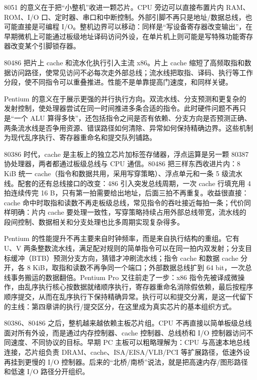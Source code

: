 8051 的意义在于把“小整机”收进一颗芯片。CPU 旁边可以直接布置片内 RAM、ROM、I/O 口、定时器、串口和中断控制。外部引脚不再只是地址/数据总线，也可能直接是可编程 I/O。整机边界可以移动：同样是“写设备寄存器改变输出”，在早期微机上可能通过板级地址译码访问外设，在单片机上则可能是写特殊功能寄存器改变某个引脚锁存器。

80486 把片上 cache 和流水化执行引入主流 x86。片上 cache 缩短了高频取指和数据访问路径，使常见访问不必每次走外部总线；流水线把取指、译码、执行等工作分段，使不同指令可以重叠推进。性能不是单靠提高门速度，和同样关键。

Pentium 的意义在于展示更强的并行执行方向。双流水线、分支预测和更复杂的发射控制，使处理器尝试在同一时间推进多条合适的指令。此时硬件问题不再只是“一个 ALU 算得多快”，还包括指令之间是否有依赖、分支方向是否预测正确、两条流水线是否争用资源、错误路径如何清除、异常如何保持精确边界。这些机制为现代乱序执行、寄存器重命名和提交队列铺路。

80386 时代，cache 是主板上的独立芯片加标签存储器，浮点运算是另一颗 80387 协处理器，两者都通过板级总线与 CPU 通信。80486 把三样东西收进片内：8 KiB 统一 cache（指令和数据共用，采用写穿策略）、浮点单元和一条 5 级流水线。配套的还有总线接口的改变：486 引入突发总线周期，一次 cache 行填充用 4 拍连续传完 16 B，只有第一拍需要给出地址，后面三拍不再重复。收益很直接：cache 命中时取指和读数不再走板级总线，常见指令的吞吐接近每拍一条；代价同样明确：片内 cache 要处理一致性，写穿策略持续占用外部总线带宽，流水线的段间控制、数据相关和分支处理也比多周期实现复杂得多。

Pentium 的性能提升不再主要来自时钟频率，而是来自执行结构的重组。它有 U、V 两条整数流水线，满足配对规则的简单指令可以在同一拍内双发射；分支目标缓冲（BTB）预测分支方向，猜错才冲刷流水线；指令 cache 和数据 cache 分开，各 8 KiB，取指和读数不再争同一个端口；外部数据总线扩到 64 bit，一次总线事务搬运的数据翻倍。Pentium Pro 又往前走了一步：x86 指令先被译成微操作，由乱序执行核心按数据就绪顺序执行，寄存器重命名消除假依赖，最后按程序顺序提交，从而在乱序执行下保持精确异常。执行可以和提交分离，是这一代留下的主线：第四章讲的执行/提交区分，在这里成为真实芯片的基本组织方式。

80386、80486 之后，整机越来越依赖主板芯片组。CPU 不再直接以简单板级总线面对所有外设，而是通过内存控制器、cache 控制器、总线桥和 I/O 控制器访问不同速度、不同协议的目标。早期 PC 主板可以粗略理解为：CPU 与高速本地总线连接，芯片组负责 DRAM、cache、ISA/EISA/VLB/PCI 等扩展路径，低速外设再挂到更慢的 I/O 控制器。后来的“北桥/南桥”说法，就是把高速内存/图形路径和低速 I/O 路径分开组织。

